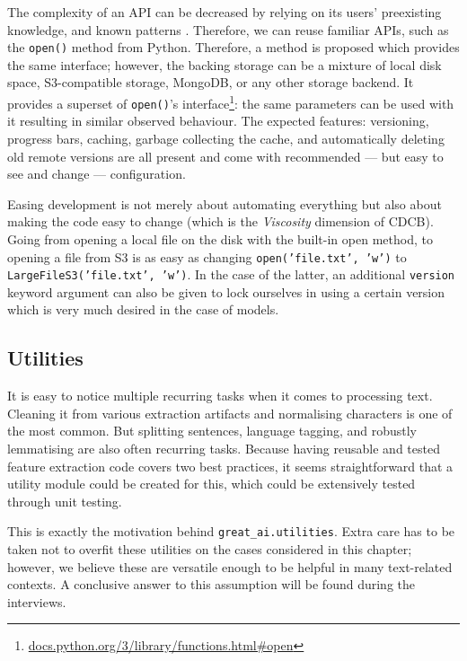 The complexity of an API can be decreased by relying on its users' preexisting knowledge, and known patterns \cite{hermans2021programmer,ousterhout2018philosophy}. Therefore, we can reuse familiar APIs, such as the \texttt{open()} method from Python. Therefore, a method is proposed which provides the same interface; however, the backing storage can be a mixture of local disk space, S3-compatible storage, MongoDB, or any other storage backend. It provides a superset of \texttt{open()}'s interface\footnote{\href{https://docs.python.org/3/library/functions.html\#open}{docs.python.org/3/library/functions.html\#open}}: the same parameters can be used with it resulting in similar observed behaviour. The expected features: versioning, progress bars, caching, garbage collecting the cache, and automatically deleting old remote versions are all present and come with recommended --- but easy to see and change --- configuration.

Easing development is not merely about automating everything but also about making the code easy to change (which is the \textit{Viscosity} dimension of CDCB). Going from opening a local file on the disk with the built-in open method, to opening a file from S3 is as easy as changing \texttt{open('file.txt', 'w')} to \texttt{LargeFileS3('file.txt', 'w')}. In the case of the latter, an additional \texttt{version} keyword argument can also be given to lock ourselves in using a certain version which is very much desired in the case of models.

\subsection{Utilities}

It is easy to notice multiple recurring tasks when it comes to processing text. Cleaning it from various extraction artifacts and normalising characters is one of the most common. But splitting sentences, language tagging, and robustly lemmatising are also often recurring tasks. Because having reusable and tested feature extraction code covers two best practices, it seems straightforward that a utility module could be created for this, which could be extensively tested through unit testing.

This is exactly the motivation behind \texttt{great\_ai.utilities}. Extra care has to be taken not to overfit these utilities on the cases considered in this chapter; however, we believe these are versatile enough to be helpful in many text-related contexts. A conclusive answer to this assumption will be found during the interviews.

